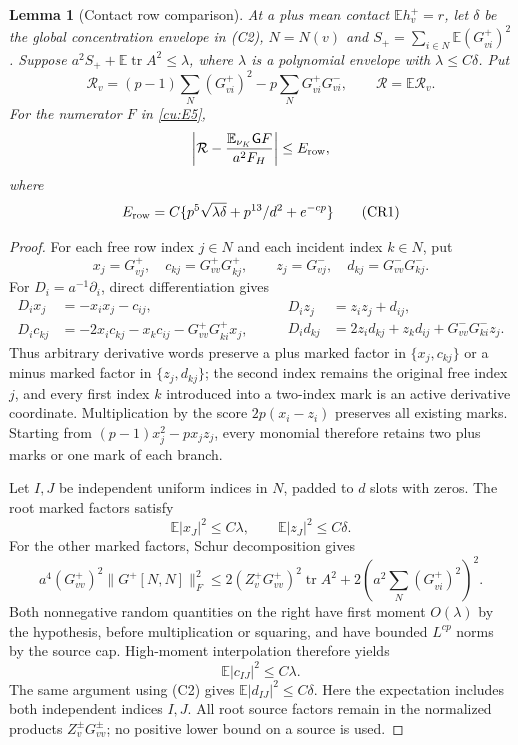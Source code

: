 \documentclass[10pt]{article}
\numberwithin{equation}{section}
\newtheorem{lemma}{Lemma}[section]
\newcommand{\1}{\mathbf1}
\begin{document}
\begin{lemma}[Contact row comparison]\label{cu:star-comparison}
At a plus mean contact $\mathbb Eh_v^+=r$, let $\delta$ be the global
concentration envelope in (C2), $N=N(v)$ and
$S_+=\sum_{i\in N}\mathbb E(G^+_{vi})^2$.
Suppose $a^2S_++\mathbb E\operatorname{tr}A^2\le\lambda$,
where $\lambda$ is a polynomial envelope with $\lambda\le C\delta$. Put
\[
 \mathcal R_v=(p-1)\sum_N(G^+_{vi})^2-p\sum_NG^+_{vi}G^-_{vi},
 \qquad \mathcal R=\mathbb E\mathcal R_v.
\]
For the numerator $F$ in \eqref{cu:E5},
\[
 \left|\mathcal R-\frac{\mathbb E_{\nu_K}\mathsf GF}{a^2F_H}\right|
 \le E_{\rm row},
\]
where
\[
 E_{\rm row}
 =C\{p^5\sqrt{\lambda\delta}+p^{13}/d^2+e^{-cp}\}
 \tag{CR1}
\]
\end{lemma}
\begin{proof}
For each free row index $j\in N$ and each incident index $k\in N$, put
\[
 x_j=G^+_{vj},\quad c_{kj}=G^+_{vv}G^+_{kj},\qquad
 z_j=G^-_{vj},\quad d_{kj}=G^-_{vv}G^-_{kj}.
\]
For $D_i=a^{-1}\partial_i$, direct differentiation gives
\[
 \begin{split}
 D_ix_j&=-x_ix_j-c_{ij},\\
 D_ic_{kj}&=-2x_ic_{kj}-x_kc_{ij}-G^+_{vv}G^+_{ki}x_j,
 \end{split}
 \qquad
 \begin{split}
 D_iz_j&=z_iz_j+d_{ij},\\
 D_id_{kj}&=2z_id_{kj}+z_kd_{ij}+G^-_{vv}G^-_{ki}z_j.
 \end{split}
 \tag{CR2}
\]
Thus arbitrary derivative words preserve a plus marked factor in
$\{x_j,c_{kj}\}$ or a minus marked factor in $\{z_j,d_{kj}\}$;
the second index remains the original free index $j$, and every first
index $k$ introduced into a two-index mark is an active derivative
coordinate. Multiplication by the score $2p(x_i-z_i)$ preserves all
existing marks. Starting from $(p-1)x_j^2-px_jz_j$, every monomial
therefore retains two plus marks or one mark of each branch.


Let $I,J$ be independent uniform indices in $N$, padded to $d$ slots
with zeros. The root marked factors satisfy
\[
 \mathbb E|x_J|^2\le C\lambda,\qquad
 \mathbb E|z_J|^2\le C\delta.
\]
For the other marked factors, Schur decomposition gives
\[
 a^4(G^+_{vv})^2\|G^+[N,N]\|_F^2
 \le2(Z_v^+G^+_{vv})^2\operatorname{tr}A^2
       +2\left(a^2\sum_N(G^+_{vi})^2\right)^2.
\]
Both nonnegative random quantities on the right have first moment
$O(\lambda)$ by the hypothesis, before multiplication or squaring, and have
bounded $L^{cp}$ norms by the source cap. High-moment interpolation
therefore yields
\[
 \mathbb E|c_{IJ}|^2\le C\lambda.
\]
The same argument using (C2) gives $\mathbb E|d_{IJ}|^2\le C\delta$.
Here the expectation includes both independent indices $I,J$.
All root source factors remain in the normalized products
$Z_v^\pm G^\pm_{vv}$; no positive lower bound on a source is used.


\end{proof}
\end{document}
